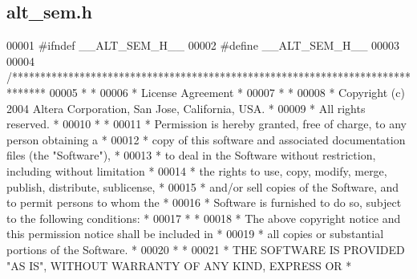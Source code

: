 \subsection{alt\+\_\+sem.\+h}
\label{alt__sem_8h_source}

\begin{DoxyCode}
00001 \textcolor{preprocessor}{#ifndef \_\_ALT\_SEM\_H\_\_}
00002 \textcolor{preprocessor}{#define \_\_ALT\_SEM\_H\_\_}
00003 
00004 \textcolor{comment}{/******************************************************************************}
00005 \textcolor{comment}{*                                                                             *}
00006 \textcolor{comment}{* License Agreement                                                           *}
00007 \textcolor{comment}{*                                                                             *}
00008 \textcolor{comment}{* Copyright (c) 2004 Altera Corporation, San Jose, California, USA.           *}
00009 \textcolor{comment}{* All rights reserved.                                                        *}
00010 \textcolor{comment}{*                                                                             *}
00011 \textcolor{comment}{* Permission is hereby granted, free of charge, to any person obtaining a     *}
00012 \textcolor{comment}{* copy of this software and associated documentation files (the "Software"),  *}
00013 \textcolor{comment}{* to deal in the Software without restriction, including without limitation   *}
00014 \textcolor{comment}{* the rights to use, copy, modify, merge, publish, distribute, sublicense,    *}
00015 \textcolor{comment}{* and/or sell copies of the Software, and to permit persons to whom the       *}
00016 \textcolor{comment}{* Software is furnished to do so, subject to the following conditions:        *}
00017 \textcolor{comment}{*                                                                             *}
00018 \textcolor{comment}{* The above copyright notice and this permission notice shall be included in  *}
00019 \textcolor{comment}{* all copies or substantial portions of the Software.                         *}
00020 \textcolor{comment}{*                                                                             *}
00021 \textcolor{comment}{* THE SOFTWARE IS PROVIDED "AS IS", WITHOUT WARRANTY OF ANY KIND, EXPRESS OR  *}

\end{DoxyCode}
